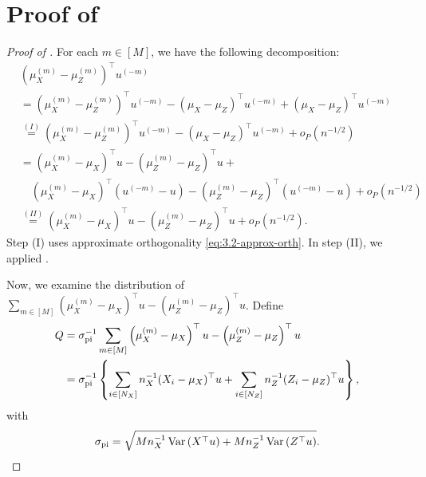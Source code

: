 \documentclass[11pt]{article}
\begin{document}
\section{Proof of }
\label{app: app_orthogonal}
\begin{proof}[Proof of ]
 For each $m\in[M]$, we have the following decomposition:
    \begin{equation}
\begin{aligned}
&\left(\mu_X^{(m)}-\mu_Z^{(m)}\right)^{\top} u^{(-m)}\\
& = \left(\mu_X^{(m)}-\mu_Z^{(m)}\right)^{\top} u^{(-m)} - \left(\mu_X-\mu_Z\right)^{\top} u^{(-m)} + \left(\mu_X-\mu_Z\right)^{\top} u^{(-m)}\\
& \stackrel{(I)}{ = }\left(\mu_X^{(m)}-\mu_Z^{(m)}\right)^{\top} u^{(-m)} - \left(\mu_X-\mu_Z\right)^{\top} u^{(-m)} + o_P(n^{-1/2})\\
& = \left(\mu_X^{(m)}- \mu_X\right)^\top u - \left(\mu_Z^{(m)} - \mu_Z\right)^{\top} u + \\
& \quad \left(\mu_X^{(m)}-\mu_X\right)^{\top}\left(u^{(-m)}-u\right)-\left(\mu_Z^{(m)}-\mu_Z\right)^{\top}\left(u^{(-m)}-u\right)+ o_P(n^{-1/2})\\
& \stackrel{(II)}{ = } \left(\mu_X^{(m)}-\mu_X\right)^{\top} u-\left(\mu_Z^{(m)}-\mu_Z\right)^{\top} u + o_P(n^{-1/2}).
\end{aligned}
\end{equation}
Step (I) uses approximate orthogonality \eqref{eq:3.2-approx-orth}. In step (II), we applied .

Now, we examine the distribution of 
$\sum_{m \in[M]}\left(\mu_X^{(m)}-\mu_X\right)^{\top} u-\left(\mu_Z^{(m)}-\mu_Z\right)^{\top} u$. Define
\begin{equation}
\begin{aligned}
  Q & = \sigma_{\rm pi}^{-1}
\sum_{m \in[M]}\left(\mu_X^{(m)}-\mu_X\right)^{\top} u-\left(\mu_Z^{(m)}-\mu_Z\right)^{\top} u\\
& = \sigma_{\rm pi}^{-1}\left\{\sum_{i\in [N_X]} n_X^{-1}(X_i - \mu_X)^\top u + \sum_{i\in [N_Z]} n_Z^{-1}(Z_i - \mu_Z)^\top u\right\},
\end{aligned}
\end{equation}
with
\begin{equation}
    \sigma_{\rm pi} 
    = \sqrt{Mn_X^{-1} \operatorname{Var}\left(X^{\top} u\right)+Mn_Z^{-1}  \operatorname{Var}\left(Z^{\top} u\right)}.  
\end{equation}


\end{proof}
\end{document}
